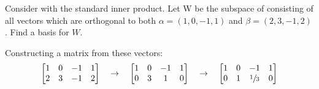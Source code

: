 \documentclass[11pt]{article}
\begin{document}
\makeAssignmentTitle

\begin{homeworkProblem}

    Consider \R[4] with the standard inner product. Let W be the subspace of \R[4] consisting of all
    vectors which are orthogonal to both $\alpha = (1, 0, -1, 1)$ and $\beta = (2, 3, -1, 2)$. Find a basis for
    $W$. \\

    \solution

    Constructing a matrix from these vectors:
    \[
        \begin{bmatrix}
            1 & 0 & -1 & 1 \\
            2 & 3 & -1 & 2 \\
        \end{bmatrix} \quad\to\quad
        \begin{bmatrix}
            1 & 0 & -1 & 1 \\
            0 & 3 & 1  & 0 \\
        \end{bmatrix} \quad\to\quad
        \begin{bmatrix}
            1 & 0 & -1           & 1 \\
            0 & 1 & \sfrac{1}{3} & 0 \\
        \end{bmatrix}
    \]


\end{homeworkProblem}
\end{document}
